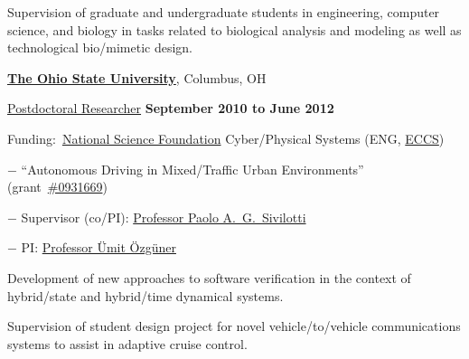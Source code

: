 \documentclass[10pt]{article}
\renewcommand\textit[1]{\underline{#1}}
\newcommand{\halfblankline}{\quad\vspace{-0.5\baselineskip}\pagebreak[3]}
\begin{document}
\begin{outerlist}
\begin{innerlist}
                \item Supervision of graduate and undergraduate students
                    in engineering, computer science, and biology in
                    tasks related to biological analysis and modeling as
                    well as technological bio\-/mimetic design.
            \end{innerlist}

\end{outerlist}

\halfblankline

\href{http://www.osu.edu/}{\textbf{The Ohio State University}},
Columbus, OH
\begin{outerlist}

    \item[] \textit{Postdoctoral Researcher}%
            \hfill \textbf{September 2010 to June 2012}
            \begin{innerlist}
                \item Funding:~\href{http://www.nfs.gov/}{National Science Foundation} Cyber\-/Physical Systems (ENG, \href{http://www.nsf.gov/div/index.jsp?div=eccs}{ECCS})
                \begin{innerlist}
                    \item[$-$] ``Autonomous Driving in Mixed\-/Traffic Urban Environments''
                        (grant~\href{http://www.nsf.gov/awardsearch/showAward.do?AwardNumber=0931669}{\#0931669})
                    \item[$-$] Supervisor (co\-/PI):
                        \href{http://www.cse.ohio-state.edu/~paolo/}%
                             {Professor Paolo A.~G.~Sivilotti}
                    \item[$-$] PI:
                        \href{http://www.ece.ohio-state.edu/~umit/}%
                             {Professor \"{U}mit \"{O}zg\"{u}ner}
                \end{innerlist}

                \item Development of new approaches to software
                    verification in the context of hybrid\-/state and
                    hybrid\-/time dynamical systems.

                \item Supervision of student design project for
                    novel vehicle\-/to\-/vehicle communications
                    systems to assist in adaptive cruise control.
            \end{innerlist}

\end{outerlist}
\end{document}
